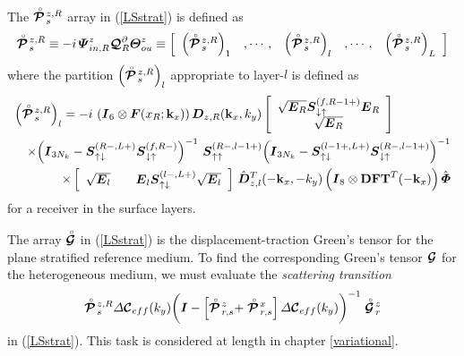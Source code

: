The $\stackrel{\scriptscriptstyle _{\,\,\circ}}{ \mbox{\boldmath$\cal P$\unboldmath}}\!{}^{z,R}_{s}$ array in (\ref{LSstrat})  is defined as
\begin{equation} \label{rfCBPzRs}
\stackrel{\scriptscriptstyle _{\,\,\circ}}{ \mbox{\boldmath$\cal P$\unboldmath}}\!{}^{z,R}_{s} \equiv -i\,{\mbox{\boldmath$\mit \Psi$\unboldmath}}^{z}_{in,R}
{\mbox{\boldmath$\cal Q$\unboldmath}}^{\partial}_{R}  {\mbox{\boldmath$\mit \Theta$\unboldmath}}^{z}_{ou}
\equiv\left[\begin{array}{ccccc} \left(\stackrel{\scriptscriptstyle _{\,\,\circ}}{ \mbox{\boldmath$\cal P$\unboldmath}}\!{}^{z,R}_{s}\right)_{1}&
,\cdots,&\left(\stackrel{\scriptscriptstyle _{\,\,\circ}}{ \mbox{\boldmath$\cal P$\unboldmath}}\!{}^{z,R}_{s}\right)_{l}&,\cdots,&
\left(\stackrel{\scriptscriptstyle _{\,\,\circ}}{ \mbox{\boldmath$\cal P$\unboldmath}}\!{}^{z,R}_{s}\right)_{L}  \end{array}\right]
\end{equation}
where the partition $\left(\stackrel{\scriptscriptstyle _{\,\,\circ}}{ \mbox{\boldmath$\cal P$\unboldmath}}\!{}^{z,R}_{s}\right)_{l}$ 
appropriate to layer-$l$ is defined as
\begin{eqnarray} \label{rfCBPzRsl}
\lefteqn{
\left(\rf{\CB P}\!{}^{z,R}_{s}\right)_{l}=-i\,
 \left({\bmi I}_6\otimes 
{\bmi F}(x_{R};{\bf k}_{x})\right){\bmi  D}_{z,R}({\bf k}_{x},{k}_{y})
\left[{\begin{array}{c}
\sqrt{{\bmi E}_{R}}{\bmi S}{}_{\downarrow\uparrow }^{   (f,{R-1}+)}{{\bmi E}}_{R}\\ 
\sqrt{{\bmi E}_{R}}\end{array}}\right]   
 }\nonumber\\
&&
\times{\left({\bmi  I}_{ 3 N_k}-
{\bmi S}{}_{\uparrow\downarrow }^{ (R-,L+)} {\bmi S}{}_{\downarrow\uparrow 
}^{(f,R-)}\right)}^{-1}\
 {\bmi S}{}_{\uparrow\uparrow }^{ (R-,{l-1}+)}
{\left({{\bmi  I}_{
3 N_k}-{\bmi S}{}_{\uparrow\downarrow }^{ ({l-1}+,L+)}
{{\bmi S}}{}_{\downarrow\uparrow }^{ (R-,{l-1}+)}}\right)}^{-1}\nonumber\\
&&
\times\left[{\begin{array}{cc}
\sqrt{{\bmi E}_{l}}&\quad{{\bmi E}}_{l}{\bmi 
S}{}_{\uparrow\downarrow }^{(l-, 
L+)} \sqrt{{\bmi E}_{l}}\end{array}}\right]
\,\hat{\bmi  D}{}^{T}_{z,l}(-{\bf k}_{x},-{k}_{y})\left({\bmi I}_8\otimes
{\bf DFT}^{T}(-{\bf k}_{x})  \right)\hat{\bmi \Phi}
\end{eqnarray}
for a receiver in the surface layers.

The array $\stackrel{\scriptscriptstyle _{\,\,\circ}}{ \mbox{\boldmath$\cal G$\unboldmath}}$ in (\ref{LSstrat}) is the displacement-traction 
Green's tensor for the plane stratified reference medium. To find the 
corresponding Green's tensor ${\mbox{\boldmath$\cal G$\unboldmath}}$ for the heterogeneous medium, we 
must evaluate the {\em scattering transition\/}
\[
\stackrel{\scriptscriptstyle _{\,\,\circ}}{ \mbox{\boldmath$\cal P$\unboldmath}}\!{}^{z,R}_{s} 
{\mit \Delta}{\mbox{\boldmath$\cal C$\unboldmath}}{}_{eff}(k_y)
\bigg({\mbox{\boldmath$\mit I$\unboldmath}} -  
\left[\stackrel{\scriptscriptstyle _{\,\,\circ}}{ \mbox{\boldmath$\cal P$\unboldmath}}\!{}^{z}_{r,s}+\stackrel{\scriptscriptstyle _{\,\,\circ}}{ \mbox{\boldmath$\cal P$\unboldmath}}\!{}^{x}_{r,s}\right]
{\mit \Delta}{\mbox{\boldmath$\cal C$\unboldmath}}{}_{eff}(k_y)\bigg)^{-1} 
\stackrel{\scriptscriptstyle _{\,\,\circ}}{ \mbox{\boldmath$\cal G$\unboldmath}}\!{}^{z}_{r}
\]
in (\ref{LSstrat}). This task is considered at length in chapter 
\ref{variational}. 


